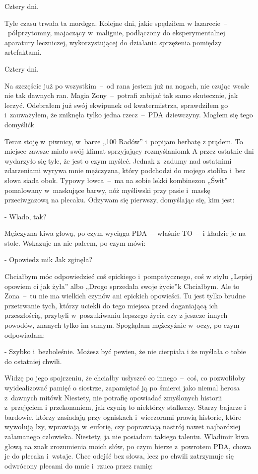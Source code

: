 \documentclass[../MAIN.tex]{subfiles}
\begin{document}
Cztery dni.

Tyle czasu trwała ta mordęga. Kolejne dni, jakie spędziłem w
lazarecie~--~półprzytomny, majaczący w~malignie, podłączony do
eksperymentalnej aparatury leczniczej, wykorzystującej do
działania sprzężenia pomiędzy artefaktami.

Cztery dni.

Na szczęście już po wszystkim~--~od rana jestem już na nogach,
nie czując wcale nie tak dawnych ran. Magia Zony~--~potrafi
zabijać tak samo skutecznie, jak leczyć. Odebrałem już swój
ekwipunek od kwatermistrza, sprawdziłem go i~zauważyłem, że
zniknęła tylko jedna rzecz~--~PDA dziewczyny. Mogłem się tego
domyślić\3k

Teraz stoję w~piwnicy, w~barze „100 Radów” i~popijam herbatę z
prądem. To miejsce zawsze miało swój klimat sprzyjający
rozmyślaniom\3k A przez ostatnie dni wydarzyło się tyle, że
jest
o czym myśleć. Jednak z~zadumy nad ostatnimi zdarzeniami wyrywa
mnie mężczyzna, który podchodzi do mojego stolika i~bez słowa
siada obok. Typowy łowca~--~ma na sobie lekki kombinezon „Świt”
pomalowany w~maskujące barwy, nóż myśliwski przy pasie i~maskę
przeciwgazową na plecaku. Odzywam się pierwszy, domyślając się,
kim jest:

- Wlado, tak?

Mężczyzna kiwa głową, po czym wyciąga PDA~--~właśnie TO~--~i
kładzie je na stole. Wskazuje na nie palcem, po czym mówi:

- Opowiedz mi\3k Jak zginęła?

Chciałbym móc odpowiedzieć coś epickiego i~pompatycznego, coś w
stylu „Lepiej opowiem ci jak żyła” albo „Drogo sprzedała swoje
życie”\3k Chciałbym. Ale to Zona~--~tu nie ma wielkich czynów
ani
epickich opowieści. Tu jest tylko brudne przetrwanie tych,
którzy uciekli do tego miejsca przed doganiającą ich
przeszłością, przybyli w~poszukiwaniu lepszego życia czy z
jeszcze innych powodów, znanych tylko im samym. Spoglądam
mężczyźnie w~oczy, po czym odpowiadam:

- Szybko i~bezboleśnie. Możesz być pewien, że nie cierpiała i
że myślała o tobie do ostatniej chwili.

Widzę po jego spojrzeniu, że chciałby usłyszeć co
innego~--~coś,
co pozwoliłoby wyidealizować pamięć o siostrze, zapamiętać ją
po śmierci jako niemal herosa z~dawnych mitów\3k Niestety, nie
potrafię opowiadać zmyślonych historii z~przejęciem i
przekonaniem, jak czynią to niektórzy stalkerzy. Starzy bajarze
i bardowie, którzy zasiadają przy ogniskach i~wieczorami prawią
historie, które wywołują łzy, wprawiają w~euforię, czy
poprawiają nastrój nawet najbardziej załamanego człowieka.
Niestety, ja nie posiadam takiego talentu. Wladimir kiwa głową
na znak zrozumienia moich słów, po czym bierze z~powrotem PDA,
chowa je do plecaka i~wstaje. Chce odejść bez słowa, lecz po
chwili zatrzymuje się odwrócony plecami do mnie i~rzuca przez
ramię:
\end{document}
